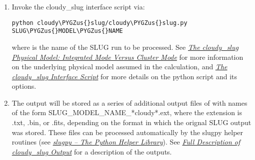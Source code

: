 \documentclass[letterpaper,10pt,english]{sphinxmanual}
\def\PYGZus{\char`\_}
\begin{document}
\begin{enumerate}
\item {} 
Invoke the cloudy\_slug interface script via:

\begin{Verbatim}[commandchars=\\\{\}]
python cloudy\PYGZus{}slug/cloudy\PYGZus{}slug.py SLUG\PYGZus{}MODEL\PYGZus{}NAME
\end{Verbatim}

where  is the name of the SLUG run to be
processed. See {\hyperref[cloudy:ssec\string-cloudy\string-cluster]{\emph{The cloudy\_slug Physical Model: Integrated Mode Versus Cluster Mode}}} for more information on
the underlying physical model assumed in the calculation, and
{\hyperref[cloudy:ssec\string-cloudy\string-slug\string-options]{\emph{The cloudy\_slug Interface Script}}} for more details on the python
script and its options.

\item {} 
The output will be stored as a series of additional output files of
with names of the form SLUG\_MODEL\_NAME\_*cloudy*.ext, where the
extension is .txt, .bin, or .fits, depending on the format in which
the orignal SLUG output was stored. These files can be processed
automatically by the slugpy helper routines (see
{\hyperref[slugpy:sec\string-slugpy]{\emph{slugpy -- The Python Helper Library}}}). See {\hyperref[cloudy:ssec\string-cloudy\string-output]{\emph{Full Description of cloudy\_slug Output}}} for a description
of the outputs.

\end{enumerate}
\end{document}
